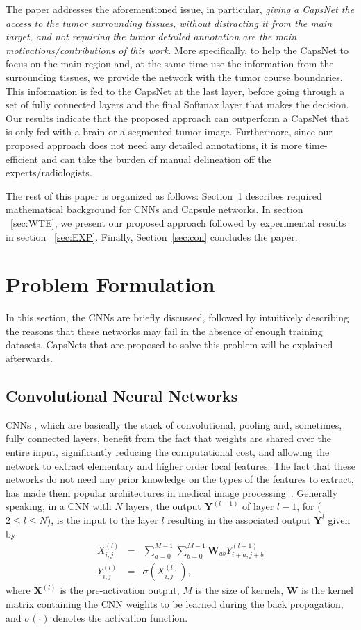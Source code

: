 \documentclass{article}
\def\X{\bm{X}}
\def\Y{\bm{Y}}
\def\W{\bm{W}}
\begin{document}
The paper addresses the aforementioned issue, in particular, \textit{giving a CapsNet the access to the tumor surrounding tissues, without distracting it from the main target, and not requiring the tumor detailed annotation are the main motivations/contributions of this work}. More specifically, to help the CapsNet to focus on the main region and, at the same time use the information from the surrounding tissues, we provide the network with the tumor course boundaries. This information is fed to the CapsNet at the last layer, before going through a set of fully connected layers and the final Softmax layer that makes the decision. Our results indicate that the proposed approach can outperform a CapsNet that is only fed with a brain or a segmented tumor image. Furthermore, since our proposed approach does not need any detailed annotations, it is more time-efficient and can take the burden of manual delineation off the experts/radiologists.

The rest of this paper is organized as follows: Section~\ref{sec:framework} describes required mathematical background for CNNs and Capsule networks. In section ~\ref{sec:WTE}, we present our proposed approach followed by experimental results in section ~\ref{sec:EXP}. Finally, Section~\ref{sec:con} concludes the paper.
\section{Problem Formulation} \label{sec:framework}
In this section,  the CNNs are briefly discussed, followed by intuitively describing the reasons that these networks may fail in the absence of enough training datasets. CapsNets that are proposed to solve this problem will be explained afterwards.

\subsection{Convolutional Neural Networks} \label{sec:conv}
CNNs \cite{Lecun:1998}, which are basically the stack of convolutional, pooling and, sometimes, fully connected layers, benefit from the fact that weights are shared over the entire input, significantly reducing the computational cost,  and allowing the network to extract elementary and higher order local features. The fact that these networks do not need any prior knowledge on the types of the features to extract, has made them popular architectures in medical image processing~\cite{Ravi:2017}. Generally speaking, in a CNN with $N$ layers, the output $\Y^{(l-1)}$ of layer $l-1$, for ($2 \leq l \leq N$),  is the input to the layer $l$ resulting in the associated output $\Y^l$ given by
\begin{eqnarray}
X^{(l)}_{i, j} &=& \sum_{a=0}^{M-1}\sum_{b=0}^{M-1}\W_{ab}Y^{(l-1)}_{i+a, j+b}\\
Y^{(l)}_{i, j} &=& \sigma (X^{(l)}_{i,j}),
\end{eqnarray}
where $\X^{(l)}$ is the pre-activation output, $M$ is the size of kernels, $\W$ is the kernel matrix containing the CNN weights to be learned during the back propagation, and $\sigma(\cdot)$ denotes the activation function.
\end{document}
